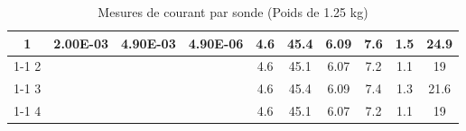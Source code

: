 \begin{table}[H]
{\begin{tabular}{|c|c|c|c|c|c|c|c|c|c|}
            1         & \multirow{4}{*}{2.00E-03}                                  & \multirow{4}{*}{4.90E-03} & \multirow{4}{*}{4.90E-06}                               & 4.6                                                      & 45.4                                                    & 6.09                                                                & 7.6                                                              & 1.5    & 24.9                                                               \\ \cline{1-1} \cline{5-10}
            2         &                                                            &                           &                                                         & 4.6                                                      & 45.1                                                    & 6.07                                                                & 7.2                                                              & 1.1    & 19                                                                 \\ \cline{1-1} \cline{5-10}
            3         &                                                            &                           &                                                         & 4.6                                                      & 45.4                                                    & 6.09                                                                & 7.4                                                              & 1.3    & 21.6                                                               \\ \cline{1-1} \cline{5-10}
            4         &                                                            &                           &                                                         & 4.6                                                      & 45.1                                                    & 6.07                                                                & 7.2                                                              & 1.1    & 19                                                                 \\ \hline
        \end{tabular}%
    }
    \caption{Mesures de courant par sonde (Poids de 1.25 kg)}
    \label{tab:poids_1_25_sonde}
\end{table}

